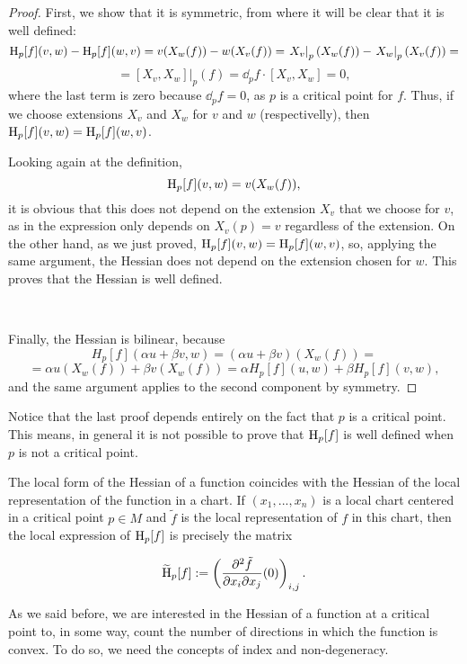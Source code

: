 \begin{proof}
	First, we show that it is symmetric, from where it will be clear that it is well defined:
$$\operatorname H_p[f](v,w) - \operatorname H_p[f](w,v) = v(X_w(f)) - w(X_v(f)) = \left. X_v \right|_p(X_w(f)) - \left. X_w \right|_p (X_v(f)) = $$ 
$$= \left. [X_v,X_w] \right|_p(f) = \dd_p f \cdot [X_v,X_w] = 0 ,$$
where the last term is zero because $\dd_p f = 0$, as $p$ is a critical point for $f$. Thus, if we choose extensions $X_v$ and $X_w$ for $v$ and $w$ (respectivelly), then $\operatorname H_p[f](v,w) = \operatorname H_p[f](w,v)$.

Looking again at the definition,
$$\operatorname H_p[f](v,w) = v(X_w(f)),$$
it is obvious that this does not depend on the extension $X_v$ that we choose for $v$, as in the expression only depends on $X_v(p) = v$ regardless of the extension. On the other hand, as we just proved, $\operatorname H_p[f](v,w) = \operatorname H_p[f](w,v)$, so, applying the same argument, the Hessian does not depend on the extension chosen for $w$. This proves that the Hessian is well defined.

\

Finally, the Hessian is bilinear, because
$$H_p[f](\alpha u + \beta v, w) = (\alpha u + \beta v)(X_w(f)) = $$
$$= \alpha u(X_w(f)) + \beta v(X_w(f)) = \alpha H_p[f](u,w) + \beta H_p[f](v,w) ,$$
and the same argument applies to the second component by symmetry.
\end{proof}

Notice that the last proof depends entirely on the fact that $p$ is a critical point. This means, in general it is not possible to prove that $\operatorname H_p[f]$ is well defined when $p$ is not a critical point.

\begin{rmrk}
	The local form of the Hessian of a function coincides with the Hessian of the local representation of the function in a chart. If $(x_1,...,x_n)$ is a local chart centered in a critical point $p \in M$ and $\tilde{f}$ is the local representation of $f$ in this chart, then the local expression of $\operatorname H_p[f]$ is precisely the matrix

\begin{displaymath}
	\widetilde{\operatorname H}_p[f] := \left( \frac{\partial^2 \tilde{f}}{\partial x_i \partial x_j}(0) \right)_{i,j} .
\end{displaymath}
\end{rmrk}

As we said before, we are interested in the Hessian of a function at a critical point to, in some way, count the number of directions in which the function is convex. To do so, we need the concepts of index and non-degeneracy.

